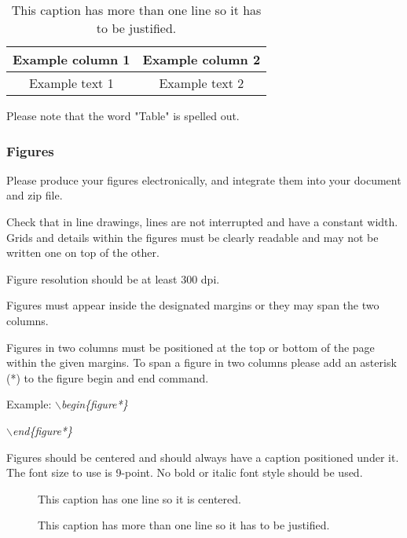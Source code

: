 \documentclass[a4paper,twoside]{article}
\begin{document}
\begin{table}[h]
\caption{This caption has more than one line so it has to be
justified.}\label{tab:example2} \centering
\begin{tabular}{|c|c|}
  \hline
  Example column 1 & Example column 2 \\
  \hline
  Example text 1 & Example text 2 \\
  \hline
\end{tabular}
\end{table}

Please note that the word "Table" is spelled out.


\subsubsection{Figures}

Please produce your figures electronically, and integrate them into
your document and zip file.

Check that in line drawings, lines are not interrupted and have a
constant width. Grids and details within the figures must be clearly
readable and may not be written one on top of the other.

Figure resolution should be at least 300 dpi.

Figures must appear inside the designated margins or they may span
the two columns.

Figures in two columns must be positioned at the top or bottom of
the page within the given margins. To span a figure in two columns please add an asterisk (*) to the figure begin and end command.

Example: \textit{$\backslash$begin\{figure*\}}

\hspace*{1.5cm}\textit{$\backslash$end\{figure*\}}

Figures should be centered and should always have a caption
positioned under it. The font size to use is 9-point. No bold or
italic font style should be used.

\begin{figure}[!h]
  \centering
   {}
  \caption{This caption has one line so it is centered.}
  \label{fig:example1}
 \end{figure}

\begin{figure}[!h]
  \vspace{-0.2cm}
  \centering
   {}
  \caption{This caption has more than one line so it has to be justified.}
  \label{fig:example2}
  \vspace{-0.1cm}
\end{figure}
\end{document}
